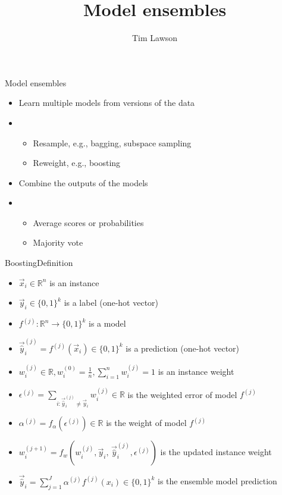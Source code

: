 \documentclass[10pt]{beamer}
\title{Model ensembles}
\author{Tim Lawson}
\begin{document}
\maketitle

\begin{frame}{Model ensembles}
  \begin{itemize}
    \item Learn multiple models from versions of the data
    \item[]
          \begin{itemize}
            \item Resample, e.g., bagging, subspace sampling
            \item Reweight, e.g., boosting
          \end{itemize}
    \item Combine the outputs of the models
    \item[]
          \begin{itemize}
            \item Average scores or probabilities
            \item Majority vote
          \end{itemize}
  \end{itemize}
\end{frame}

\begin{frame}{Boosting}{Definition}
  \begin{itemize}
    \item $\vec{x}_i \in \mathbb{R}^n$ is an instance
    \item $\vec{y}_i \in \{0,1\}^k$ is a label (one-hot vector)
    \item $f^{(j)} : \mathbb{R}^n \to \{0,1\}^k$ is a model
    \item $\vec{\hat{y}}_i^{(j)} = f^{(j)}(\vec{x}_i) \in \{0,1\}^k$ is a prediction (one-hot vector)
    \item $w_i^{(j)} \in \mathbb{R}, w_i^{(0)} = \frac{1}{n}, \sum_{i = 1}^{n}w^{(j)}_i = 1$ is an instance weight
    \item $\epsilon^{(j)} = \sum_{i : \vec{\hat{y}}_i^{(j)} \neq \vec{y}_i} w^{(j)}_i \in \mathbb{R}$ is the weighted error of model $f^{(j)}$
    \item $\alpha^{(j)} = f_\alpha(\epsilon^{(j)}) \in \mathbb{R}$ is the weight of model $f^{(j)}$
    \item $w^{(j+1)}_i = f_w(w^{(j)}_i, \vec{y}_i,\,\vec{\hat{y}}_i^{(j)}, \epsilon^{(j)})$ is the updated instance weight
    \item $\vec{\hat{y}}_i = \sum_{j = 1}^{J}\alpha^{(j)}f^{(j)}(x_i) \in \{0,1\}^k$ is the ensemble model prediction
  \end{itemize}
\end{frame}
\end{document}

